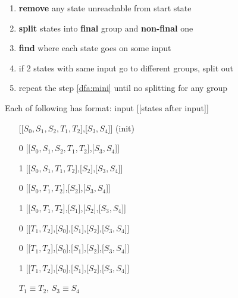 \begin{enumerate}
\item \textbf{remove} any state unreachable from start state
\item \textbf{split} states into \textbf{final} group and \textbf{non-final} one
\item\label{dfa:mini} \textbf{find} where each state goes on some input
\item if 2 states with same input go to different groups, split out
\item repeat the step \ref{dfa:mini} until no splitting for any group
\end{enumerate}
Each of following has format: input [[states after input]]
{\footnotesize
\begin{minipage}{0.5\linewidth}
    \begin{enumerate}[leftmargin=*,labelindent=0pt]
\item[] [[$S_{0},S_{1},S_{2},T_{1},T_{2}$],[$S_{3},S_{4}$]] (init)
\item[0] [[$S_{0},S_{1},S_{2},T_{1},T_{2}$],[$S_{3},S_{4}$]]
\item[1] [[$S_{0},S_{1},T_{1},T_{2}$],[$S_{2}$],[$S_{3},S_{4}$]]
\item[0] [[$S_{0},T_{1},T_{2}$],[$S_{2}$],[$S_{3},S_{4}$]]
\item[1] [[$S_{0},T_{1},T_{2}$],[$S_{1}$],[$S_{2}$],[$S_{3},S_{4}$]]
\item[0] [[$T_{1},T_{2}$],[$S_{0}$],[$S_{1}$],[$S_{2}$],[$S_{3},S_{4}$]]
\item[0] [[$T_{1},T_{2}$],[$S_{0}$],[$S_{1}$],[$S_{2}$],[$S_{3},S_{4}$]]
\item[1] [[$T_{1},T_{2}$],[$S_{0}$],[$S_{1}$],[$S_{2}$],[$S_{3},S_{4}$]]
\item[] $T_{1} \equiv T_{2}$, $S_{3} \equiv S_{4}$
\end{enumerate}
\end{minipage}
\begin{minipage}{0.45\linewidth}
\end{minipage}}
